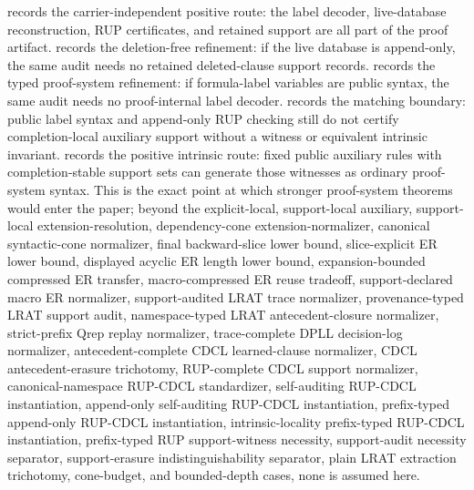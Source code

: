 \documentclass[11pt]{article}
\theoremstyle{definition}
\begin{document}
 records the carrier-independent positive route: the label decoder, live-database reconstruction, RUP certificates, and retained support are all part of the proof artifact.   records the deletion-free refinement: if the live database is append-only, the same audit needs no retained deleted-clause support records.   records the typed proof-system refinement: if formula-label variables are public syntax, the same audit needs no proof-internal label decoder.   records the matching boundary: public label syntax and append-only RUP checking still do not certify completion-local auxiliary support without a witness or equivalent intrinsic invariant.   records the positive intrinsic route: fixed public auxiliary rules with completion-stable support sets can generate those witnesses as ordinary proof-system syntax.  This is the exact point at which stronger proof-system theorems would enter the paper; beyond the explicit-local, support-local auxiliary, support-local extension-resolution, dependency-cone extension-normalizer, canonical syntactic-cone normalizer, final backward-slice lower bound, slice-explicit ER lower bound, displayed acyclic ER length lower bound, expansion-bounded compressed ER transfer, macro-compressed ER reuse tradeoff, support-declared macro ER normalizer, support-audited LRAT trace normalizer, provenance-typed LRAT support audit, namespace-typed LRAT antecedent-closure normalizer, strict-prefix Qrep replay normalizer, trace-complete DPLL decision-log normalizer, antecedent-complete CDCL learned-clause normalizer, CDCL antecedent-erasure trichotomy, RUP-complete CDCL support normalizer, canonical-namespace RUP-CDCL standardizer, self-auditing RUP-CDCL instantiation, append-only self-auditing RUP-CDCL instantiation, prefix-typed append-only RUP-CDCL instantiation, intrinsic-locality prefix-typed RUP-CDCL instantiation, prefix-typed RUP support-witness necessity, support-audit necessity separator, support-erasure indistinguishability separator, plain LRAT extraction trichotomy, cone-budget, and bounded-depth cases, none is assumed here.
\end{document}
